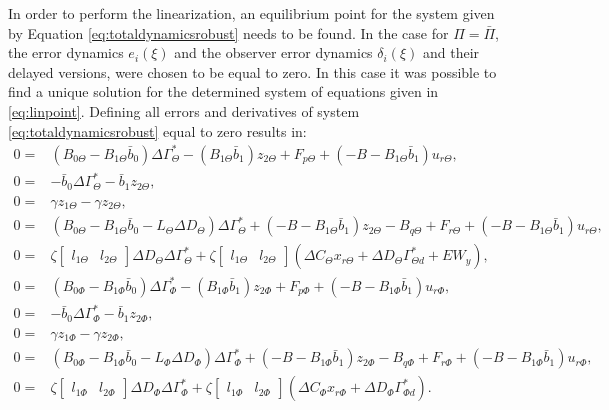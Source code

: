 \documentclass[../main.tex]{subfiles}
\begin{document}
In order to perform the linearization, an equilibrium point for the system given by Equation \eqref{eq:totaldynamicsrobust} needs to be found. In the case for $\Pi = \bar{\Pi}$, the error dynamics $e_i(\xi)$ and the observer error dynamics $\delta_i(\xi)$ and their delayed versions, were chosen to be equal to zero. In this case it was possible to find a unique solution for the determined system of equations given in \eqref{eq:linpoint}. Defining all errors and derivatives of system \eqref{eq:totaldynamicsrobust} equal to zero results in:
\begin{align}
0 =& (B_{0\Theta} - B_{1\Theta}\bar{b}_0)\Delta \Gamma_\Theta^* - (B_{1\Theta}\bar{b}_1) z_{2\Theta} + F_{p\Theta} + (-B - B_{1\Theta}\bar{b}_1)u_{r\Theta}, \nonumber \\
0 =& -\bar{b}_0 \Delta \Gamma_\Theta^* - \bar{b}_1 z_{2\Theta}, \nonumber \\
0 =& \gamma z_{1\Theta} - \gamma z_{2\Theta}, \nonumber \\
0 =& (B_{0\Theta} - B_{1\Theta}\bar{b}_0 - L_\Theta \Delta D_\Theta ) \Delta \Gamma_\Theta^* + (-B - B_{1\Theta}\bar{b}_1)z_{2\Theta} - B_{q\Theta} + F_{r\Theta} + (-B - B_{1\Theta}\bar{b}_1)u_{r\Theta}, \nonumber \\
0 =&   \zeta \begin{bmatrix}l_{1\Theta} & l_{2\Theta}\end{bmatrix} \Delta D_\Theta \Delta \Gamma_\Theta^* + \zeta \begin{bmatrix}l_{1\Theta} & l_{2\Theta} \end{bmatrix}(\Delta C_\Theta x_{r\Theta} + \Delta D_\Theta \Gamma_{\Theta d}^* + E W_y), \nonumber \\
%
%
%
0 =& (B_{0\Phi} - B_{1\Phi}\bar{b}_0)\Delta \Gamma_\Phi^* - (B_{1\Phi}\bar{b}_1) z_{2\Phi} + F_{p\Phi} + (-B - B_{1\Phi}\bar{b}_1)u_{r\Phi}, \nonumber \\
0 =& -\bar{b}_0 \Delta \Gamma_\Phi^* - \bar{b}_1 z_{2\Phi}, \nonumber \\
0 =& \gamma z_{1\Phi} - \gamma z_{2\Phi}, \nonumber \\
0 =& (B_{0\Phi} - B_{1\Phi}\bar{b}_0 - L_\Phi \Delta D_\Phi ) \Delta \Gamma_\Phi^* + (-B - B_{1\Phi}\bar{b}_1)z_{2\Phi} - B_{q\Phi} + F_{r\Phi} + (-B - B_{1\Phi}\bar{b}_1)u_{r\Phi}, \nonumber \\
0 =&   \zeta \begin{bmatrix}l_{1\Phi} & l_{2\Phi}\end{bmatrix} \Delta D_\Phi \Delta \Gamma_\Phi^* + \zeta \begin{bmatrix}l_{1\Phi} & l_{2\Phi} \end{bmatrix}(\Delta C_\Phi x_{r\Phi} + \Delta D_\Phi \Gamma_{\Phi d}^*). \nonumber \\
\end{align}
\end{document}
